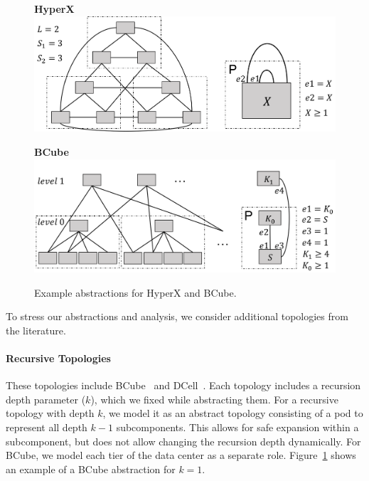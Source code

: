 \documentclass[numbers, 10pt]{sigplanconf}
\newcommand{\para}[1]{\paragraph*{\textbf{#1}}}
\newcommand{\hdr}[2]{\flushleft \chdr{\hspace{5mm}#1}{#2}}
\newcommand{\chdr}[2]{\textbf{#1} {#2} \\ \centering}%
\begin{document}
\begin{figure}[t!]
  \begin{minipage}[t]{\linewidth}
    \hdr{HyperX}{}
    \vspace{.6em}
    \includegraphics[width=\linewidth]{figures/hyperx}
  \end{minipage}%

  \vspace{1em}
  \begin{minipage}[t]{\linewidth}
    \hdr{BCube}{}
    \vspace{.1em}
    \includegraphics[width=\linewidth]{figures/bcube}
  \end{minipage}%


  \caption{Example abstractions for HyperX and BCube.}
  \label{fig:example-abstractions}
  \vspace{-.8em}%
\end{figure}

To stress our abstractions and analysis, we consider additional topologies from the literature.

\para{Recursive Topologies}
These topologies include BCube~\cite{bcube} and DCell~\cite{dcell}. Each topology includes a recursion depth parameter ($k$), which we fixed while abstracting them. For a recursive topology with depth $k$, we model it as an abstract topology consisting of a pod to represent all depth $k-1$ subcomponents. This allows for safe expansion within a subcomponent, but does not allow changing the recursion depth dynamically.
For BCube, we model each tier of the data center as a separate role. Figure~\ref{fig:example-abstractions} shows an example of a BCube abstraction for $k=1$.
\end{document}
